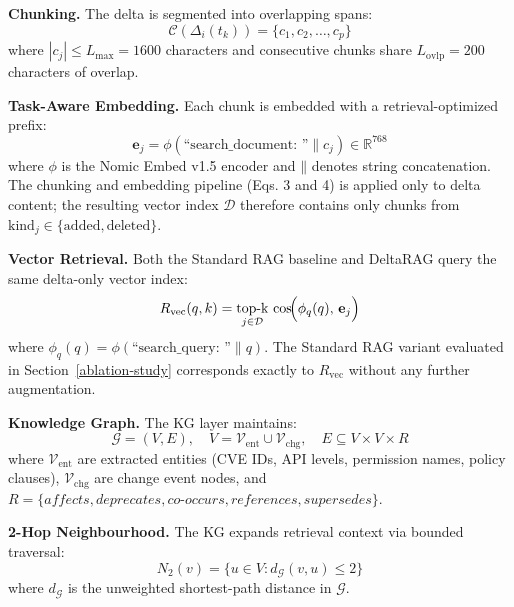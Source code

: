 \documentclass[
]{article}
\begin{document}
\noindent\textbf{Chunking.} The delta is segmented into overlapping spans:
\begin{equation}
  \mathcal{C}\!\left(\Delta_i(t_k)\right) = \{c_1, c_2, \ldots, c_p\}
\end{equation}
where $|c_j| \leq L_{\max} = 1600$ characters and consecutive chunks share $L_{\mathrm{ovlp}} = 200$ characters of overlap.

\noindent\textbf{Task-Aware Embedding.} Each chunk is embedded with a retrieval-optimized prefix:
\begin{equation}
  \mathbf{e}_j = \phi\!\left(\text{``search\_document: ''} \mathbin\| c_j\right) \in \mathbb{R}^{768}
\end{equation}
where $\phi$ is the Nomic Embed v1.5 encoder and $\mathbin\|$ denotes string concatenation. The chunking and embedding pipeline (Eqs. 3 and 4) is applied only to delta content; the resulting vector index $\mathcal{D}$ therefore contains only chunks from $\mathrm{kind}_j \in \{\mathrm{added}, \mathrm{deleted}\}$.

\noindent\textbf{Vector Retrieval.} Both the Standard RAG baseline and DeltaRAG query the same delta-only vector index:
\begin{equation}
  R_{\mathrm{vec}}(q,k) =
    \operatorname*{top\text{-}k}_{j \in \mathcal{D}}\,
    \cos\!\Bigl(\phi_q(q),\, \mathbf{e}_j\Bigr)
\end{equation}
where $\phi_q(q) = \phi(\text{``search\_query: ''} \mathbin\| q)$. The Standard RAG variant evaluated in Section~\ref{ablation-study} corresponds exactly to $R_{\mathrm{vec}}$ without any further augmentation.

\noindent\textbf{Knowledge Graph.} The KG layer maintains:
\begin{equation}
  \mathcal{G} = (V, E), \quad
  V = \mathcal{V}_{\mathrm{ent}} \cup \mathcal{V}_{\mathrm{chg}}, \quad
  E \subseteq V \times V \times R
\end{equation}
where $\mathcal{V}_{\mathrm{ent}}$ are extracted entities (CVE IDs, API levels, permission names, policy clauses), $\mathcal{V}_{\mathrm{chg}}$ are change event nodes, and $R = \{\textit{affects}, \textit{deprecates}, \textit{co-occurs}, \textit{references}, \textit{supersedes}\}$.

\noindent\textbf{2-Hop Neighbourhood.} The KG expands retrieval context via bounded traversal:
\begin{equation}
  N_2(v) = \bigl\{u \in V : d_{\mathcal{G}}(v, u) \leq 2\bigr\}
\end{equation}
where $d_{\mathcal{G}}$ is the unweighted shortest-path distance in $\mathcal{G}$.
\end{document}
